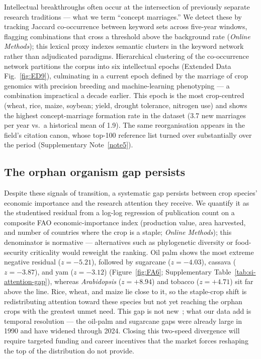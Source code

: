 Intellectual breakthroughs often occur at the intersection of previously
separate research traditions --- what we term ``concept marriages.'' We detect
these by tracking Jaccard co-occurrence between keyword sets across five-year
windows, flagging combinations that cross a threshold above the background rate
(\textit{Online Methods}); this lexical proxy indexes semantic clusters in the
keyword network rather than adjudicated paradigms. Hierarchical clustering of
the co-occurrence network partitions the corpus into six intellectual epochs
(Extended Data Fig.~\ref{fig:ED9}), culminating in a current epoch defined by
the marriage of crop genomics with precision breeding and machine-learning
phenotyping --- a combination impractical a decade earlier. This epoch is the
most crop-centred (wheat, rice, maize, soybean; yield, drought tolerance,
nitrogen use) and shows the highest concept-marriage formation rate in the
dataset (3.7 new marriages per year vs.\ a historical mean of 1.9). The same
reorganisation appears in the field's citation canon, whose top-100 reference
list turned over substantially over the period
(Supplementary Note~\ref{note5}).


\subsection*{The orphan organism gap persists}

Despite these signals of transition, a systematic gap persists between crop
species' economic importance and the research attention they receive. We
quantify it as the studentised residual from a log-log regression of publication
count on a composite FAO economic-importance index (production value, area
harvested, and number of countries where the crop is a staple;
\textit{Online Methods}); this denominator is normative --- alternatives such as
phylogenetic diversity or food-security criticality would reweight the ranking.
Oil palm shows the most extreme negative residual ($z = -5.21$), followed by
sugarcane ($z = -4.03$), cassava ($z = -3.87$), and yam ($z = -3.12$)
(Figure~\ref{fig:FA6}; Supplementary Table~\ref{tab:si-attention-gap}), whereas
\textit{Arabidopsis} ($z = +8.94$) and tobacco ($z = +4.71$) sit far above the
line. Rice, wheat, and maize lie close to it, so the staple-crop shift is
redistributing attention toward these species but not yet reaching the orphan
crops with the greatest unmet need. This gap is not new~\cite{varshney2012}; what our
data add is temporal resolution --- the oil-palm and sugarcane gaps were already
large in 1990 and have widened through 2024. Closing this two-speed divergence
will require targeted funding and career incentives that the market forces
reshaping the top of the distribution do not provide.

